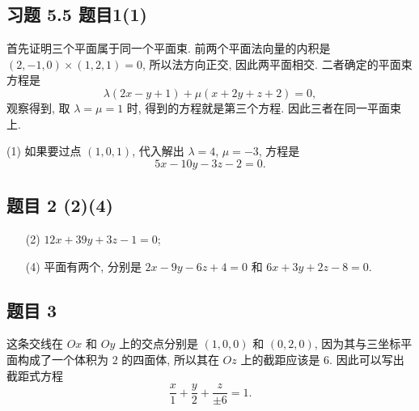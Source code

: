 \subsection*{ 习题 5.5 题目1(1) }
\begin{solution}
首先证明三个平面属于同一个平面束. 前两个平面法向量的内积是 $(2, -1, 0) \times (1, 2, 1) = 0$, 所以法方向正交, 因此两平面相交. 二者确定的平面束方程是
\[
\lambda (2x - y + 1) + \mu (x + 2y + z + 2) = 0,
\]
观察得到, 取 $\lambda = \mu = 1$ 时, 得到的方程就是第三个方程. 因此三者在同一平面束上.

(1) 如果要过点 $(1, 0, 1)$, 代入解出 $\lambda = 4$, $\mu = -3$, 方程是
\[
5x - 10y - 3z - 2 = 0.
\]
\end{solution}

\subsection*{ 题目 2 (2)(4) }
\begin{solution}
\begin{enumerate}
    \item[(2)] $12x + 39y + 3z - 1 = 0$;
    \item[(4)] 平面有两个, 分别是 $2x - 9y - 6z + 4 = 0$ 和 $6x + 3y + 2z - 8 = 0$.
\end{enumerate}
\end{solution}

\subsection*{ 题目 3 }
\begin{solution}
这条交线在 $Ox$ 和 $Oy$ 上的交点分别是 $(1, 0, 0)$ 和 $(0, 2, 0)$, 因为其与三坐标平面构成了一个体积为 $2$ 的四面体, 所以其在 $Oz$ 上的截距应该是 $6$. 因此可以写出截距式方程
\[
\frac{x}{1} + \frac{y}{2} + \frac{z}{\pm 6} = 1.
\]
\end{solution}
